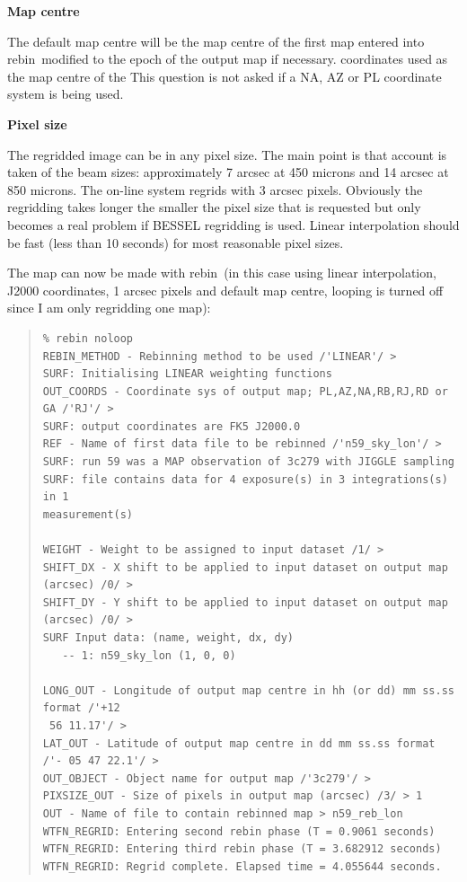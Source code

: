 \documentclass[twoside,11pt]{article}
\newcommand{\task}[1]{{\sf #1}}
\newcommand{\rebin}{\htmlref{\task{rebin}}{REBIN}}
\newenvironment{myquote}{\begin{quote}\begin{small}}{\end{small}\end{quote}}
\newcommand{\htmlref}[2]{#1}
\renewcommand{\_}{\texttt{\symbol{95}}}
\begin{document}
\begin{description}
\item {\bf Map centre}

The default map centre will be the map centre of the first map entered into
\rebin\ modified to the epoch of the output map if necessary.  coordinates
used as the map centre of the This question is not asked if a NA, AZ or PL
coordinate system is being used.

\item {\bf Pixel size}

The regridded image can be in any pixel size. The main point is that account
is taken of the beam sizes: approximately 7 arcsec at 450 microns and 14
arcsec at 850 microns.  The on-line system regrids with 3 arcsec
pixels. Obviously the regridding takes longer the smaller the pixel size that
is requested but only becomes a real problem if BESSEL regridding is
used. Linear interpolation should be fast (less than 10 seconds) for most
reasonable pixel sizes.

\end{description}

The map can now be made with \rebin\ (in this case using linear interpolation,
J2000 coordinates, 1 arcsec pixels and default map centre, looping is turned
off since I am only regridding one map):
\begin{myquote}
\begin{verbatim}
% rebin noloop
REBIN_METHOD - Rebinning method to be used /'LINEAR'/ > 
SURF: Initialising LINEAR weighting functions
OUT_COORDS - Coordinate sys of output map; PL,AZ,NA,RB,RJ,RD or GA /'RJ'/ > 
SURF: output coordinates are FK5 J2000.0
REF - Name of first data file to be rebinned /'n59_sky_lon'/ > 
SURF: run 59 was a MAP observation of 3c279 with JIGGLE sampling
SURF: file contains data for 4 exposure(s) in 3 integrations(s) in 1
measurement(s)
 
WEIGHT - Weight to be assigned to input dataset /1/ > 
SHIFT_DX - X shift to be applied to input dataset on output map (arcsec) /0/ > 
SHIFT_DY - Y shift to be applied to input dataset on output map (arcsec) /0/ > 
SURF Input data: (name, weight, dx, dy)
   -- 1: n59_sky_lon (1, 0, 0)
 
LONG_OUT - Longitude of output map centre in hh (or dd) mm ss.ss format /'+12
 56 11.17'/ > 
LAT_OUT - Latitude of output map centre in dd mm ss.ss format /'- 05 47 22.1'/ > 
OUT_OBJECT - Object name for output map /'3c279'/ > 
PIXSIZE_OUT - Size of pixels in output map (arcsec) /3/ > 1
OUT - Name of file to contain rebinned map > n59_reb_lon
WTFN_REGRID: Entering second rebin phase (T = 0.9061 seconds)
WTFN_REGRID: Entering third rebin phase (T = 3.682912 seconds)
WTFN_REGRID: Regrid complete. Elapsed time = 4.055644 seconds.
\end{verbatim}
\end{myquote}
\end{document}
